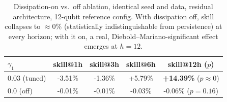 \begin{table}[t]
\centering\footnotesize
\begin{tabular}{lcccc}
\toprule
$\gamma_1$ & skill@1h & skill@3h & skill@6h & skill@12h ($p$) \\
\midrule
$0.03$ (tuned) & -3.51\% & -1.36\% & +5.79\% & \textbf{+14.39\%} ($p{\approx}0$) \\
$0.0$ (off) & -0.01\% & -0.01\% & -0.03\% & -0.06\% ($p{=}0.16$) \\
\bottomrule
\end{tabular}
\caption{Dissipation-on vs.\ off ablation, identical seed and data, residual architecture, 12-qubit reference config. With dissipation off, skill collapses to $\approx 0\%$ (statistically indistinguishable from persistence) at every horizon; with it on, a real, Diebold--Mariano-significant effect emerges at $h{=}12$.}
\label{tab:ablation}
\end{table}
